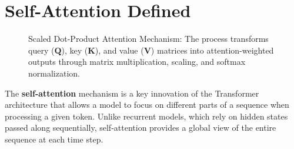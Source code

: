 \section{Self-Attention Defined}
\label{sec:self_attention}

\begin{figure}[h]
\centering
{}
\caption{Scaled Dot-Product Attention Mechanism: The process transforms query ($\mathbf{Q}$), key ($\mathbf{K}$), and value ($\mathbf{V}$) matrices into attention-weighted outputs through matrix multiplication, scaling, and softmax normalization.}
\label{fig:attention_mechanism}
\end{figure}

\noindent
The \textbf{self-attention} mechanism is a key innovation of the Transformer architecture that allows a model to focus on different parts of a sequence when processing a given token. Unlike recurrent models, which rely on hidden states passed along sequentially, self-attention provides a global view of the entire sequence at each time step.

